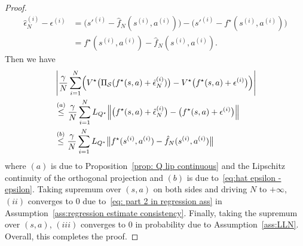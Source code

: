 \documentclass[10pt,a4paper]{amsart}
\begin{document}
\begin{proof}
\begin{align}
    \hat{\epsilon}_N^{(i)} - \epsilon^{(i)} &= \bigl(s'^{(i)} - \hat{f}_N(s^{(i)},a^{(i)})\bigr)-\bigl(s'^{(i)} - f^\star(s^{(i)},a^{(i)})\bigr)\nonumber\\
    & =f^\star(s^{(i)},a^{(i)}) - \hat{f}_N(s^{(i)},a^{(i)}).
\end{align}
Then we have
\small
\begin{align}
&\left|\frac{\gamma}{N} \sum_{i=1}^N \Bigl(V^\star\bigl(\Pi_{\mathcal S}(f^\star(s,a)+\hat\epsilon_N^{(i)})\bigr)
-V^\star\bigl(f^\star(s,a)+\epsilon^{(i)}\bigr)\Bigr)\right|\nonumber\\
&\overset{(a)}{\le} \frac{\gamma}{N} \sum_{i=1}^N L_{Q^\star}\Bigl\|\bigl(f^\star(s,a)+\hat\epsilon_N^{(i)}\bigr) - \bigl(f^\star(s,a)+\epsilon^{(i)}\bigr)\Bigr\|\nonumber\\
& \overset{(b)}{\le} \frac{\gamma}{N} \sum_{i=1}^N L_{Q^\star}\bigl\|f^\star(s^{(i)},a^{(i)}) - \hat{f}_N(s^{(i)},a^{(i)})\bigr\|\nonumber
\end{align}
\normalsize
where $(a)$ is due to Proposition\ \ref{prop: Q lip continuous} and the Lipschitz continuity of the orthogonal projection and $(b)$ is due to\ \eqref{eq:hat epsilon - epsilon}. Taking supremum over $(s,a)$ on both sides and driving $N$ to $+\infty$, $(ii)$ converges to 0 due to\ \eqref{eq: part 2 in regression ass} in Assumption\ \ref{ass:regression estimate consistency}. Finally, taking the supremum over $(s,a)$, $(iii)$ converges to $0$ in probability due to Assumption\ \ref{ass:LLN}. Overall, this completes the proof. 
\end{proof}
\end{document}
